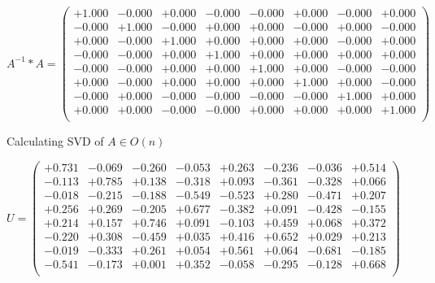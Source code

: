 \documentclass[9pt]{article}
\theoremstyle{plain}
\theoremstyle{definition}
\theoremstyle{remark}
\numberwithin{equation}{section}
\begin{document}
$A^{-1} *A = \left(
\begin{array}{
cccccccc}
+1.000 & -0.000 & +0.000 & -0.000 & -0.000 & +0.000 & -0.000 & +0.000 \\
-0.000 & +1.000 & -0.000 & +0.000 & +0.000 & -0.000 & +0.000 & -0.000 \\
+0.000 & -0.000 & +1.000 & +0.000 & +0.000 & +0.000 & -0.000 & +0.000 \\
-0.000 & -0.000 & +0.000 & +1.000 & +0.000 & +0.000 & +0.000 & +0.000 \\
-0.000 & -0.000 & +0.000 & +0.000 & +1.000 & +0.000 & -0.000 & -0.000 \\
+0.000 & -0.000 & +0.000 & +0.000 & +0.000 & +1.000 & +0.000 & -0.000 \\
-0.000 & +0.000 & -0.000 & -0.000 & -0.000 & -0.000 & +1.000 & +0.000 \\
+0.000 & +0.000 & -0.000 & -0.000 & +0.000 & +0.000 & +0.000 & +1.000 \\
\end{array}
\right)$ \newline 

Calculating SVD of  $A \in O(n)$

$U = \left(
\begin{array}{
cccccccc}
+0.731 & -0.069 & -0.260 & -0.053 & +0.263 & -0.236 & -0.036 & +0.514 \\
-0.113 & +0.785 & +0.138 & -0.318 & +0.093 & -0.361 & -0.328 & +0.066 \\
-0.018 & -0.215 & -0.188 & -0.549 & -0.523 & +0.280 & -0.471 & +0.207 \\
+0.256 & +0.269 & -0.205 & +0.677 & -0.382 & +0.091 & -0.428 & -0.155 \\
+0.214 & +0.157 & +0.746 & +0.091 & -0.103 & +0.459 & +0.068 & +0.372 \\
-0.220 & +0.308 & -0.459 & +0.035 & +0.416 & +0.652 & +0.029 & +0.213 \\
-0.019 & -0.333 & +0.261 & +0.054 & +0.561 & +0.064 & -0.681 & -0.185 \\
-0.541 & -0.173 & +0.001 & +0.352 & -0.058 & -0.295 & -0.128 & +0.668 \\
\end{array}
\right)$ \newline 
\end{document}
